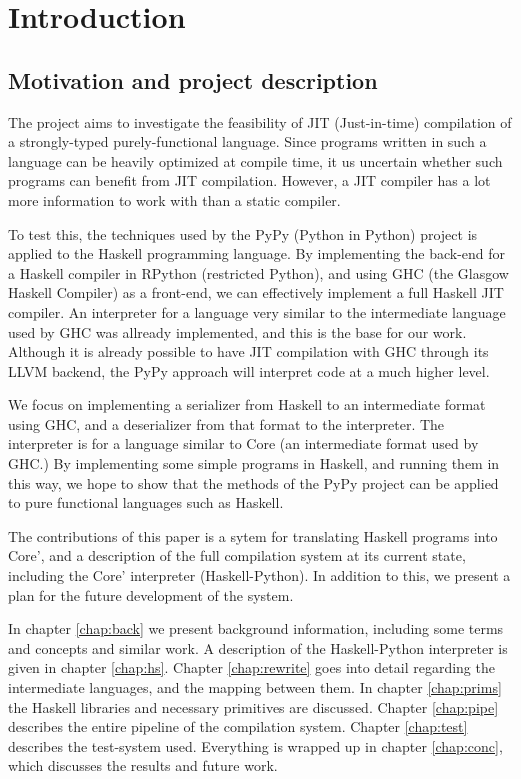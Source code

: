 
\chapter{Introduction}

\section{Motivation and project description}

The project aims to investigate the feasibility of JIT (Just-in-time) 
compilation of a strongly-typed purely-functional language. Since
programs written in such a language can be heavily optimized at 
compile time, it us uncertain whether such programs can benefit from
JIT compilation. However, a JIT compiler has a lot more information to
work with than a static compiler. 

To test this, the techniques 
used by the PyPy (Python in Python) project is applied to the Haskell 
programming language. By implementing the back-end for a Haskell compiler 
in RPython (restricted Python), and using GHC (the Glasgow Haskell Compiler) 
as a front-end, we can effectively implement a full Haskell JIT compiler. An 
interpreter for a language very similar to the intermediate language used
by GHC was allready implemented, and this is the base for our work.
Although it is already possible to have JIT compilation with GHC through
its LLVM backend, the PyPy approach will interpret code at a much higher level.

We focus on implementing a serializer from Haskell to an intermediate
format using GHC, and a deserializer from that format to the interpreter. The 
interpreter is for a language similar to Core (an intermediate format used by GHC.)
By implementing some simple programs in Haskell, and running them in this way, 
we hope to show that the methods of the PyPy project can be applied to pure 
functional languages such as Haskell.

The contributions of this paper is a sytem for translating Haskell programs
into Core', and a description of the full compilation system at its current
state, including the Core' interpreter (Haskell-Python). In addition to this,
we present a plan for the future development of the system.



In chapter \ref{chap:back} we present background information, including 
some terms and concepts and similar work. 
%
A description of the 
Haskell-Python interpreter is given in chapter \ref{chap:hs}.
%
Chapter \ref{chap:rewrite} goes into detail regarding the intermediate 
languages, and the mapping between them.
%
In chapter \ref{chap:prims} the Haskell libraries and necessary primitives
are discussed.
%
Chapter \ref{chap:pipe} describes the entire pipeline of the compilation system.
%
Chapter \ref{chap:test} describes the test-system used.
%
Everything is wrapped up in chapter \ref{chap:conc}, which discusses the 
results and future work.
